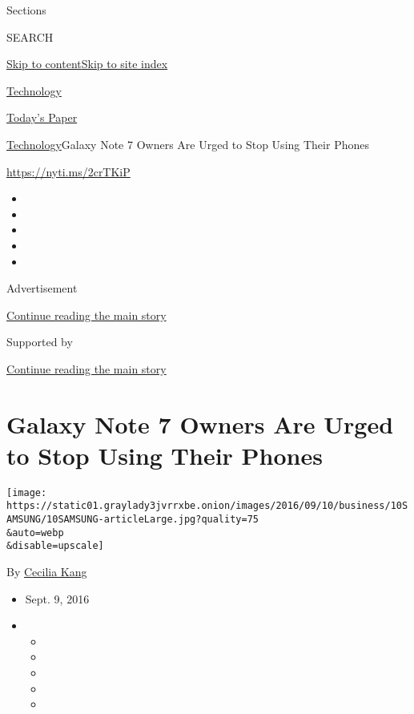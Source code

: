 Sections

SEARCH

\protect\hyperlink{site-content}{Skip to
content}\protect\hyperlink{site-index}{Skip to site index}

\href{https://www.nytimes3xbfgragh.onion/section/technology}{Technology}

\href{https://myaccount.nytimes3xbfgragh.onion/auth/login?response_type=cookie\&client_id=vi}{}

\href{https://www.nytimes3xbfgragh.onion/section/todayspaper}{Today's
Paper}

\href{/section/technology}{Technology}\textbar{}Galaxy Note 7 Owners Are
Urged to Stop Using Their Phones

\url{https://nyti.ms/2crTKiP}

\begin{itemize}
\item
\item
\item
\item
\item
\end{itemize}

Advertisement

\protect\hyperlink{after-top}{Continue reading the main story}

Supported by

\protect\hyperlink{after-sponsor}{Continue reading the main story}

\hypertarget{galaxy-note-7-owners-are-urged-to-stop-using-their-phones}{%
\section{Galaxy Note 7 Owners Are Urged to Stop Using Their
Phones}\label{galaxy-note-7-owners-are-urged-to-stop-using-their-phones}}

\texttt{[image: https://static01.graylady3jvrrxbe.onion/images/2016/09/10/business/10SAMSUNG/10SAMSUNG-articleLarge.jpg?quality=75\\\&auto=webp\\\&disable=upscale]}

By \href{http://www.nytimes3xbfgragh.onion/by/cecilia-kang}{Cecilia
Kang}

\begin{itemize}
\item
  Sept. 9, 2016
\item
  \begin{itemize}
  \item
  \item
  \item
  \item
  \item
  \end{itemize}
\end{itemize}

